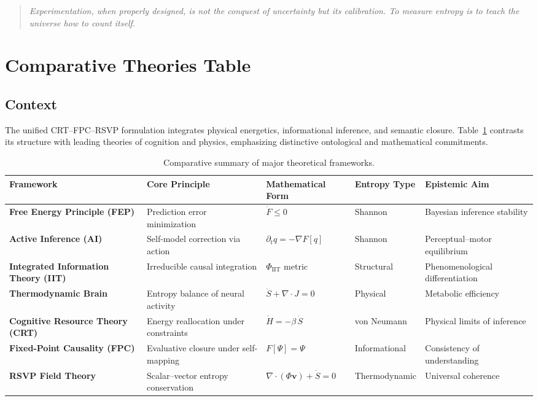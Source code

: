 \documentclass[12pt,a4paper]{article}
\begin{document}
\begin{quote}
\emph{Experimentation, when properly designed, is not the conquest of uncertainty but its calibration.  
To measure entropy is to teach the universe how to count itself.}
\end{quote}

\section{Comparative Theories Table}

\subsection{Context}

The unified CRT–FPC–RSVP formulation integrates physical energetics, informational inference, and semantic closure.
Table~\ref{tab:comparative} contrasts its structure with leading theories of cognition and physics, emphasizing distinctive ontological and mathematical commitments.

\begin{table}[h!]
\centering
\begin{tabular}{lllll}
\toprule
\textbf{Framework} & \textbf{Core Principle} & \textbf{Mathematical Form} & \textbf{Entropy Type} & \textbf{Epistemic Aim}\\
\midrule
\textbf{Free Energy Principle (FEP)} & Prediction error minimization & $\dot F \le 0$ & Shannon & Bayesian inference stability\\
\textbf{Active Inference (AI)} & Self-model correction via action & $\partial_t q = -\nabla F[q]$ & Shannon & Perceptual–motor equilibrium\\
\textbf{Integrated Information Theory (IIT)} & Irreducible causal integration & $\Phi_\text{IIT}$ metric & Structural & Phenomenological differentiation\\
\textbf{Thermodynamic Brain} & Entropy balance of neural activity & $\dot S + \nabla\!\cdot J = 0$ & Physical & Metabolic efficiency\\
\textbf{Cognitive Resource Theory (CRT)} & Energy reallocation under constraints & $\dot H = -\beta\,\dot S$ & von Neumann & Physical limits of inference\\
\textbf{Fixed-Point Causality (FPC)} & Evaluative closure under self-mapping & $F[\Psi]=\Psi$ & Informational & Consistency of understanding\\
\textbf{RSVP Field Theory} & Scalar–vector entropy conservation & $\nabla\!\cdot(\Phi\mathbf{v})+\dot S=0$ & Thermodynamic & Universal coherence\\
\bottomrule
\end{tabular}
\caption{Comparative summary of major theoretical frameworks.}
\label{tab:comparative}
\end{table}
\end{document}
